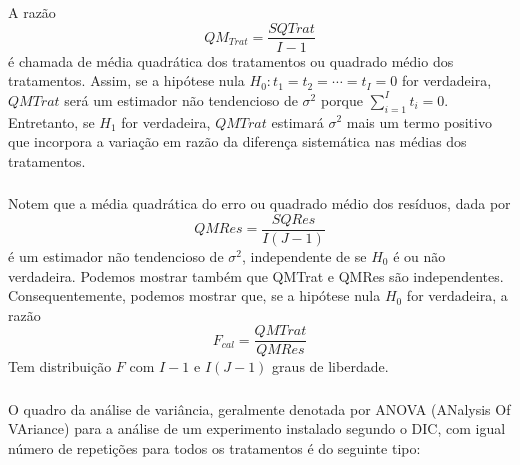 \documentclass[14pt,aspectratio=1610]{beamer}
\begin{document}
\begin{frame}{}
\frametitle{}
\begin{block}{}
\justifying
A razão
$$QM_{Trat}=\dfrac{SQTrat}{I-1}$$
é chamada de média quadrática dos tratamentos ou quadrado médio dos tratamentos. Assim, se a hipótese nula 
$H_{0}: t_{1} = t_{2} = \cdots = t_{I} = 0$ for verdadeira, $QMTrat$ será um estimador não tendencioso de $\sigma^{2}$ porque ${\displaystyle \sum_{i=1}^{I}t_{i}=0}$. Entretanto, se $H_{1}$ for verdadeira, $QMTrat$ estimará $\sigma^{2}$ mais um termo positivo que incorpora a variação em razão da diferença sistemática nas médias dos tratamentos.
\end{block}
\end{frame}

\begin{frame}{}
\frametitle{}
\begin{block}{}
\justifying
Notem que a média quadrática do erro ou quadrado médio dos resíduos, dada por $$QMRes=\dfrac{SQRes}{I(J-1)}$$ é um estimador não tendencioso de $\sigma^{2}$, independente de se $H_{0}$ é ou não verdadeira. Podemos mostrar também que QMTrat e QMRes são independentes. Consequentemente, podemos mostrar que, se a hipótese nula $H_{0}$ for verdadeira, a razão
$$F_{cal}=\dfrac{QMTrat}{QMRes}$$
Tem distribuição $F$ com $I-1$ e $I(J-1)$ graus de liberdade.
\end{block}
\end{frame}

\begin{frame}{}
\frametitle{}
\begin{block}{}
\justifying
O quadro da análise de variância, geralmente denotada por ANOVA (ANalysis Of
VAriance) para a análise de um experimento instalado segundo o DIC, com igual número
de repetições para todos os tratamentos é do seguinte tipo:
\begin{table}[!h]
\end{table}
\end{block}
\end{frame}
\end{document}

